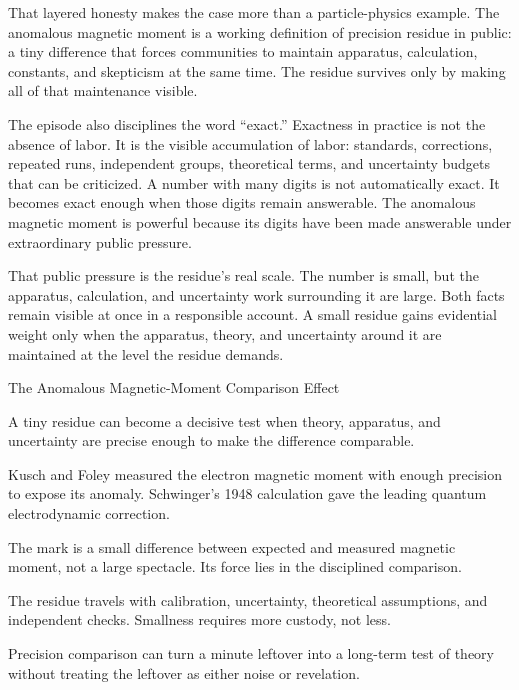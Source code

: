 That layered honesty makes the case more than a particle-physics example. The
anomalous magnetic moment is a working definition of precision residue in
public: a tiny difference that forces communities to maintain apparatus,
calculation, constants, and skepticism at the same time. The residue survives
only by making all of that maintenance visible.

The episode also disciplines the word ``exact.'' Exactness in practice is not
the absence of labor. It is the visible accumulation of labor: standards,
corrections, repeated runs, independent groups, theoretical terms, and
uncertainty budgets that can be criticized. A number with many digits is not
automatically exact. It becomes exact enough when those digits remain
answerable. The anomalous magnetic moment is powerful because its digits have
been made answerable under extraordinary public pressure.

That public pressure is the residue's real scale. The number is small, but
the apparatus, calculation, and uncertainty work surrounding it are large.
Both facts remain visible at once in a responsible account. A small residue gains evidential
weight only when the apparatus, theory, and uncertainty around it are
maintained at the level the residue demands.

\begin{phenom}{The Anomalous Magnetic-Moment Comparison Effect~\cite{kusch1948,schwinger1948}}
\label{ph:anomalous-magnetic-moment}

\PhStatement
A tiny residue can become a decisive test when theory, apparatus, and
uncertainty are precise enough to make the difference comparable.

\PhOrigin
Kusch and Foley measured the electron magnetic moment with enough precision
to expose its anomaly. Schwinger's 1948 calculation gave the leading quantum
electrodynamic correction.

\PhObservation
The mark is a small difference between expected and measured magnetic moment,
not a large spectacle. Its force lies in the disciplined comparison.

\PhConstraint
The residue travels with calibration, uncertainty, theoretical assumptions,
and independent checks. Smallness requires more custody, not less.

\PhConsequence
Precision comparison can turn a minute leftover into a long-term test of
theory without treating the leftover as either noise or revelation.
\end{phenom}

